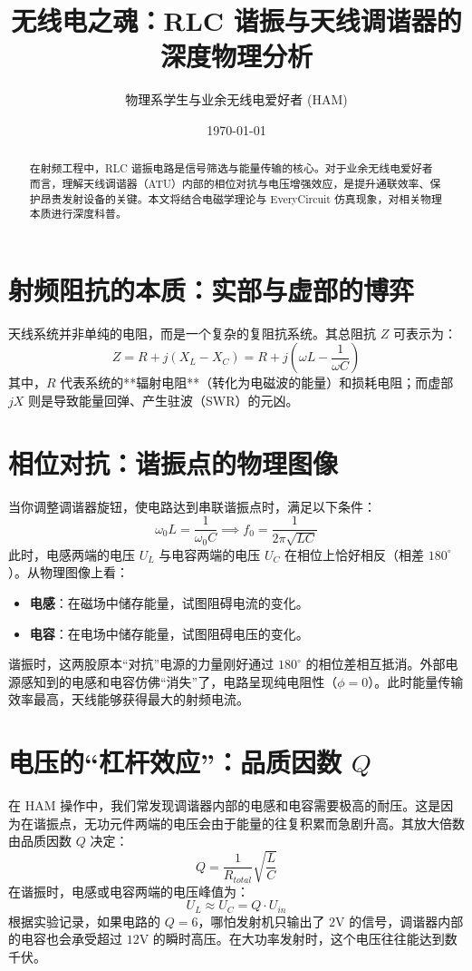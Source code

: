 \documentclass[11pt,a4paper]{ctexart} %
\title{\textbf{无线电之魂：RLC 谐振与天线调谐器的深度物理分析}}
\author{物理系学生与业余无线电爱好者 (HAM)}
\date{\today}
\begin{document}
	
	\maketitle
	
	\begin{abstract}
		在射频工程中，RLC 谐振电路是信号筛选与能量传输的核心。对于业余无线电爱好者而言，理解天线调谐器（ATU）内部的相位对抗与电压增强效应，是提升通联效率、保护昂贵发射设备的关键。本文将结合电磁学理论与 EveryCircuit 仿真现象，对相关物理本质进行深度科普。
	\end{abstract}
	
	\section{射频阻抗的本质：实部与虚部的博弈}
	天线系统并非单纯的电阻，而是一个复杂的复阻抗系统。其总阻抗 $Z$ 可表示为：
	\begin{equation}
		Z = R + j\left( X_L - X_C \right) = R + j\left( \omega L - \frac{1}{\omega C} \right)
	\end{equation}
	其中，$R$ 代表系统的**辐射电阻**（转化为电磁波的能量）和损耗电阻；而虚部 $jX$ 则是导致能量回弹、产生驻波（SWR）的元凶。
	
	\section{相位对抗：谐振点的物理图像}
	当你调整调谐器旋钮，使电路达到串联谐振点时，满足以下条件：
	\begin{equation}
		\omega_0 L = \frac{1}{\omega_0 C} \implies f_0 = \frac{1}{2\pi\sqrt{LC}}
	\end{equation}
	此时，电感两端的电压 $U_L$ 与电容两端的电压 $U_C$ 在相位上恰好相反（相差 $180^\circ$）。从物理图像上看：
	\begin{itemize}
		\item \textbf{电感}：在磁场中储存能量，试图阻碍电流的变化。
		\item \textbf{电容}：在电场中储存能量，试图阻碍电压的变化。
	\end{itemize}
	谐振时，这两股原本“对抗”电源的力量刚好通过 $180^\circ$ 的相位差相互抵消。外部电源感知到的电感和电容仿佛“消失”了，电路呈现纯电阻性（$\phi = 0$）。此时能量传输效率最高，天线能够获得最大的射频电流。
	
	\section{电压的“杠杆效应”：品质因数 $Q$}
	在 HAM 操作中，我们常发现调谐器内部的电感和电容需要极高的耐压。这是因为在谐振点，无功元件两端的电压会由于能量的往复积累而急剧升高。其放大倍数由品质因数 $Q$ 决定：
	\begin{equation}
		Q = \frac{1}{R_{total}}\sqrt{\frac{L}{C}}
	\end{equation}
	在谐振时，电感或电容两端的电压峰值为：
	\begin{equation}
		U_L \approx U_C = Q \cdot U_{in}
	\end{equation}
	根据实验记录，如果电路的 $Q=6$，哪怕发射机只输出了 $2\text{V}$ 的信号，调谐器内部的电容也会承受超过 $12\text{V}$ 的瞬时高压。在大功率发射时，这个电压往往能达到数千伏。
	
\end{document}
